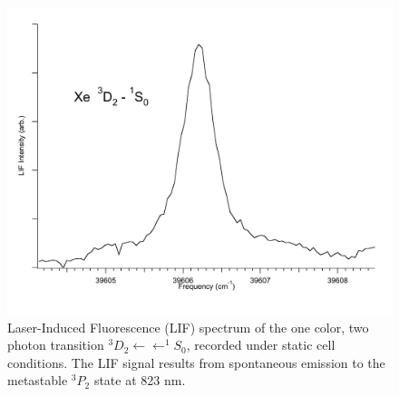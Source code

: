 \documentclass[12pt]{mitthesis}
\begin{document}
\begin{figure}
  \caption{Laser-Induced Fluorescence (LIF) spectrum of the one color,
    two photon transition  $^3D_2 \leftarrow \leftarrow
    ^1S_0$, recorded under static cell conditions.  The LIF signal
    results from spontaneous emission to the metastable $^3P_2$
    state at 823 nm.}
  \label{fig:xe3d2-cell}
  \centering
  \includegraphics[width=6in]{Xe3D2-cell.pdf}
\end{figure}
\end{document}
